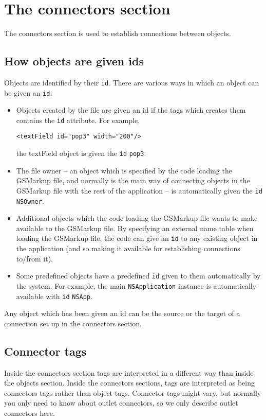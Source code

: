 \section{The connectors section}

The connectors section is used to establish connections between
objects.

\subsection{How objects are given ids}
Objects are identified by their \texttt{id}.  There are various ways
in which an object can be given an \texttt{id}:
\begin{itemize}
\item Objects created by the file are given an id if the tags which creates
them contains the \texttt{id} attribute.  For example,
\begin{verbatim}
<textField id="pop3" width="200"/>
\end{verbatim}
the textField object is given the \texttt{id} \texttt{pop3}.
\item The file owner -- an object which is specified by the code loading the
GSMarkup file, and normally is the main way of connecting objects in the
GSMarkup file with the rest of the application -- is automatically given
the \texttt{id} \texttt{NSOwner}.
\item Additional objects which the code loading the GSMarkup file wants to make
available to the GSMarkup file.  By specifying an external name table when
loading the GSMarkup file, the code can give an \texttt{id} to any
existing object in the application (and so making it available for
establishing connections to/from it).
\item Some predefined objects have a predefined \texttt{id} given to them
automatically by the system.  For example, the main
\texttt{NSApplication} instance is automatically available with \texttt{id}
\texttt{NSApp}.
\end{itemize}
Any object which has been given an id can be the source or the target
of a connection set up in the connectors section.

\subsection{Connector tags}
Inside the connectors section tags are interpreted in a different way
than inside the objects section.  Inside the connectors sections, tags
are interpreted as being connectors tags rather than object tags.
Connector tags might vary, but normally you only need to know about
outlet connectors, so we only describe outlet connectors here.

